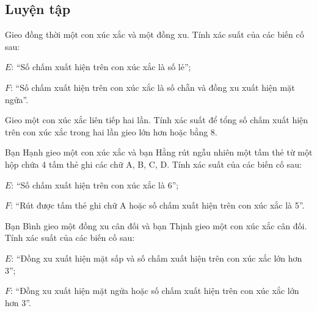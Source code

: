 \begin{practice}
    \subsection{Luyện tập}

    \begin{questions}[resume=SBT]
        \item Gieo đồng thời một con xúc xắc và một đồng xu. Tính xác suất của các biến cố sau:
        \begin{questions}
            \item $E$: “Số chấm xuất hiện trên con xúc xắc là số lẻ”;
            \item $F$: “Số chấm xuất hiện trên con xúc xắc là số chẵn và đồng xu xuất hiện mặt ngửa”.
        \end{questions}

        \answerline
        \answerline

        \item Gieo một con xúc xắc liên tiếp hai lần. Tính xác suất để tổng số chấm xuất hiện trên con xúc xắc trong hai lần gieo lớn hơn hoặc bằng 8.

        \answerline
        \answerline

        \item Bạn Hạnh gieo một con xúc xắc và bạn Hằng rút ngẫu nhiên một tấm thẻ từ một hộp chứa 4 tấm thẻ ghi các chữ A, B, C, D. Tính xác suất của các biến cố sau:
        \begin{questions}
            \item $E$: “Số chấm xuất hiện trên con xúc xắc là 6”;
            \item $F$: “Rút được tấm thẻ ghi chữ A hoặc số chấm xuất hiện trên con xúc xắc là 5”.
        \end{questions}

        \answerline
        \answerline

        \item Bạn Bình gieo một đồng xu cân đối và bạn Thịnh gieo một con xúc xắc cân đối. Tính xác suất của các biến cố sau:
        \begin{questions}
            \item $E$: “Đồng xu xuất hiện mặt sấp và số chấm xuất hiện trên con xúc xắc lớn hơn 3”;
            \item $F$: “Đồng xu xuất hiện mặt ngửa hoặc số chấm xuất hiện trên con xúc xắc lớn hơn 3”.
        \end{questions}


\end{questions}
\end{practice}
